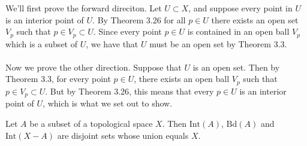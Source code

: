 \documentclass[letterpaper,12pt,twoside]{maths}
\begin{document}
\begin{solution}
We'll first prove the forward direciton. Let $U \subset X$, 
and suppose every point in $U$ is an
interior point of $U$. By Theorem 3.26 for all $p \in U$ 
there exists an
open set $V_p$ such that $p \in V_p \subset U.$ 
Since every point $p \in U$ is contained in an open ball
$V_p$ which is a subset of $U$, we have that $U$ must be an open 
set by Theorem 3.3.\\
\\
Now we prove the other direction. Suppose that $U$ is an open set.
Then by Theorem 3.3, for every point $p \in U$,
there exists an open ball $V_p$ such that $p \in V_p \subset U$.
But by Theorem 3.26, this means that every $p \in U$ is an
interior point of $U$, which is what we set out to show.

\end{solution}

\begin{problem}[Theorem 3.28] Let $A$ be a subset of a topological
    space $X$. Then $\text{Int}(A)$, $\text{Bd}(A)$ and
    $\text{Int}(X-A)$ are disjoint sets whose union equals $X$.
\end{problem}
\end{document}

